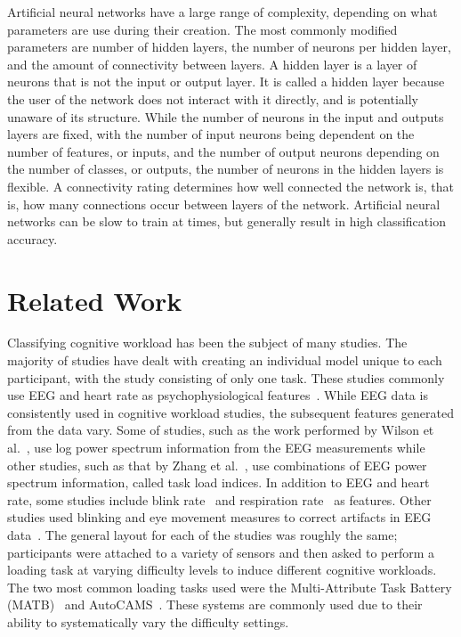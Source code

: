 \documentclass[11pt]{article}
\begin{document}
	Artificial neural networks have a large range of complexity, depending on what parameters are use during their creation. The most commonly modified parameters are number of hidden layers, the number of neurons per hidden layer, and the amount of connectivity between layers. A hidden layer is a layer of neurons that is not the input or output layer. It is called a hidden layer because the user of the network does not interact with it directly, and is potentially unaware of its structure. While the number of neurons in the input and outputs layers are fixed, with the number of input neurons being dependent on the number of features, or inputs, and the number of output neurons depending on the number of classes, or outputs, the number of neurons in the hidden layers is flexible. A connectivity rating determines how well connected the network is, that is, how many connections occur between layers of the network. Artificial neural networks can be slow to train at times, but generally result in high classification accuracy. 

\section{Related Work}
Classifying cognitive workload has been the subject of many studies. The majority of studies have dealt with creating an individual model unique to each participant, with the study consisting of only one task. These studies commonly use EEG and heart rate as psychophysiological features~\cite{Wang_R, Zhang, Wilson, Yang}. While EEG data is consistently used in cognitive workload studies, the subsequent features generated from the data vary. Some of studies, such as the work performed by Wilson et al.~\cite{Wilson}, use log power spectrum information from the EEG measurements while other studies, such as that by Zhang et al.~\cite{Zhang}, use combinations of EEG power spectrum information, called task load indices. In addition to EEG and heart rate, some studies include blink rate~\cite{Wilson, Wilson_2002} and respiration rate~\cite{Wilson_2003} as features. Other studies used blinking and eye movement measures to correct artifacts in EEG data~\cite{Wang_R}. The general layout for each of the studies was roughly the same; participants were attached to a variety of sensors and then asked to perform a loading task at varying difficulty levels to induce different cognitive workloads. The two most common loading tasks used were the Multi-Attribute Task Battery (MATB)~\cite{Comstock} and AutoCAMS~\cite{Lorenz}. These systems are commonly used due to their ability to systematically vary the difficulty settings. 
\end{document}
